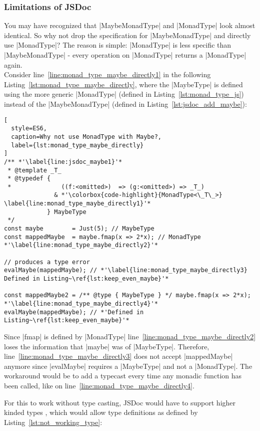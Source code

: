 \subsubsection{Limitations of JSDoc} %
\label{subsub:Limitations of JSDoc}
You may have recognized that |MaybeMonadType| and |MonadType| look almost
identical. So why not drop the specification for |MaybeMonadType| and directly
use |MonadType|? The reason is simple: |MonadType| is less specific than
|MaybeMonadType| - every operation on |MonadType| returns a |MonadType|
again.\\
Consider line~\ref{line:monad_type_maybe_directly1} in the following
Listing~\ref{lst:monad_type_maybe_directly}, where the |MaybeType| is defined
using the more generic |MonadType| (defined in Listing~\ref{lst:monad_type_js})
instead of the |MaybeMonadType| (defined in Listing~\ref{lst:jsdoc_add_maybe}):

\begin{lstlisting}[
  style=ES6,
  caption=Why not use MonadType with Maybe?,
  label={lst:monad_type_maybe_directly}
]
/** *'\label{line:jsdoc_maybe1}'*
 * @template _T_
 * @typedef { 
 *              ((f:<omitted>)  => (g:<omitted>) => _T_)
              & *'\colorbox{code-highlight}{MonadType<\_T\_>}  \label{line:monad_type_maybe_directly1}'*
            } MaybeType
 */
const maybe        = Just(5); // MaybeType
const mappedMaybe  = maybe.fmap(x => 2*x); // MonadType *'\label{line:monad_type_maybe_directly2}'*

// produces a type error
evalMaybe(mappedMaybe); // *'\label{line:monad_type_maybe_directly3} Defined in Listing~\ref{lst:keep_even_maybe}'*

const mappedMaybe2 = /** @type { MaybeType } */ maybe.fmap(x => 2*x); *'\label{line:monad_type_maybe_directly4}'*
evalMaybe(mappedMaybe); // *'Defined in Listing~\ref{lst:keep_even_maybe}'*
\end{lstlisting}

Since |fmap| is defined by |MonadType|
line~\ref{line:monad_type_maybe_directly2} loses the information that |maybe|
was of |MaybeType|. Therefore, line~\ref{line:monad_type_maybe_directly3} does
not accept |mappedMaybe| anymore since |evalMaybe| requires a |MaybeType| and
not a |MonadType|. The workaround would be to add a typecast every time any
monadic function has been called, like on
line~\ref{line:monad_type_maybe_directly4}.

For this to work without type casting, JSDoc would have to support higher
kinded types \cite{baeldung_higher-kinded_2020}, which would allow type definitions as defined by
Listing~\ref{lst:not_working_type}:

